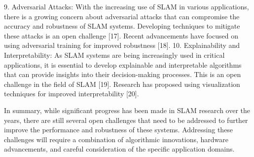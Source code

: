 \documentclass[conference]{IEEEtran}
\begin{document}
9. Adversarial Attacks: With the increasing use of SLAM in various applications, there is a growing concern about adversarial attacks that can compromise the accuracy and robustness of SLAM systems. Developing techniques to mitigate these attacks is an open challenge [17]. Recent advancements have focused on using adversarial training for improved robustness [18].
10. Explainability and Interpretability: As SLAM systems are being increasingly used in critical applications, it is essential to develop explainable and interpretable algorithms that can provide insights into their decision-making processes. This is an open challenge in the field of SLAM [19]. Research has proposed using visualization techniques for improved interpretability [20].

In summary, while significant progress has been made in SLAM research over the years, there are still several open challenges that need to be addressed to further improve the performance and robustness of these systems. Addressing these challenges will require a combination of algorithmic innovations, hardware advancements, and careful consideration of the specific application domains.
\end{document}
